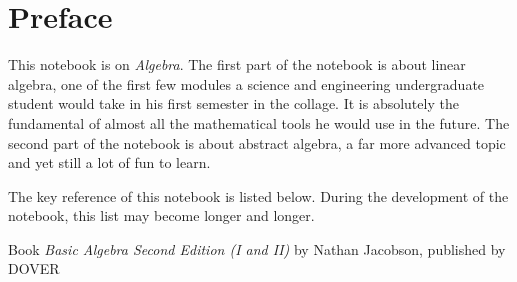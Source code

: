 \chapter*{Preface}

This notebook is on \textit{Algebra}. The first part of the notebook is about linear algebra, one of the first few modules a science and engineering undergraduate student would take in his first semester in the collage. It is absolutely the fundamental of almost all the mathematical tools he would use in the future. The second part of the notebook is about abstract algebra, a far more advanced topic and yet still a lot of fun to learn. 

The key reference of this notebook is listed below. During the development of the notebook, this list may become longer and longer.

Book \textit{Basic Algebra Second Edition (I and II)} by Nathan Jacobson, published by DOVER \cite{jacobson2012basic}
